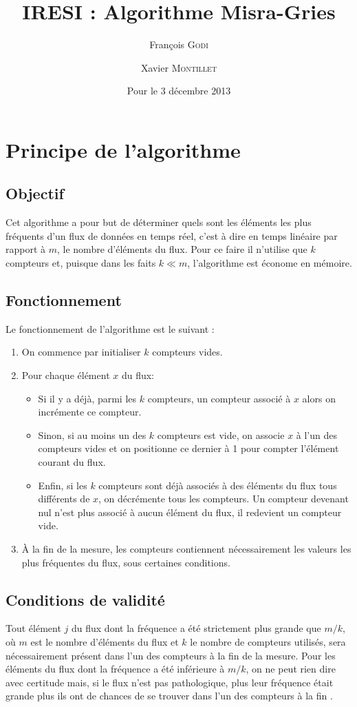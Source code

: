 \documentclass{article}
\title{IRESI : Algorithme Misra-Gries}
\author{François \textsc{Godi} \and Xavier \textsc{Montillet}}
\date{Pour le 3 décembre 2013}
\begin{document}
	
\maketitle

\section{Principe de l'algorithme}

	\subsection{Objectif}	
		Cet algorithme a pour but de déterminer quels sont les éléments les plus fréquents d'un flux de données en temps 				réel, c'est à dire en temps linéaire par rapport à $m$, le nombre d'éléments du flux. Pour ce faire il n'utilise que 			$k$ compteurs et, puisque dans les faits $k \ll m$, l'algorithme est économe en mémoire.
	
	\subsection{Fonctionnement}	
		Le fonctionnement de l'algorithme est le suivant : 
		\begin{enumerate}
			\item On commence par initialiser $k$ compteurs vides.
			\item Pour chaque élément $x$ du flux: 
				\begin{itemize}
					\item Si il y a déjà, parmi les $k$ compteurs, un compteur associé à $x$ alors 	on incrémente ce 									compteur.
					\item Sinon, si au moins un des $k$ compteurs est vide, on associe $x$ à l'un des compteurs vides et on 							positionne ce dernier à 1 pour compter l'élément courant du flux.
					\item  Enfin, si les $k$ compteurs sont déjà associés à des éléments du flux tous différents de $x$, on 							décrémente tous les compteurs. Un compteur devenant nul n'est plus associé à aucun élément du flux, 							il redevient un compteur vide.
				\end{itemize}
			\item À la fin de la mesure, les compteurs contiennent nécessairement les valeurs les plus fréquentes du flux, 						sous certaines conditions.
		\end{enumerate}				
	
	\subsection{Conditions de validité}
		Tout élément $j$ du flux dont la fréquence a été strictement plus grande que $m/k$, où $m$ est le nombre d'éléments 			du 	flux et $k$ le nombre de compteurs utilisés, sera nécessairement présent dans l'un des compteurs à la fin de la 			mesure. Pour les éléments du flux dont la fréquence a été inférieure à $m/k$, on ne peut rien dire avec certitude 				mais, si le flux n'est pas pathologique, plus leur fréquence était grande plus ils ont de chances de se trouver dans 			l'un des compteurs à la fin .
	
\end{document}
